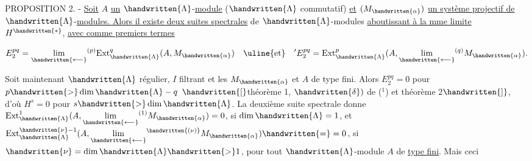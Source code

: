 
PROPOSITION 2. - \uline{Soit} $A$ \uline{un} $\handwritten{\Lambda}$-\uline{module} ($\handwritten{\Lambda}$ commutatif) \uline{et} $(M_{\handwritten{\alpha}})$ \uline{un système projectif de} $\handwritten{\Lambda}$-\uline{modules. Alors il existe deux suites spectrales} de $\handwritten{\Lambda}$-modules \uline{aboutissant à la mme limite} $H^{\handwritten{*}}$, \uline{avec comme premiers termes}

\[ E_2^{pq}=\underset{\handwritten{\longleftarrow}}{\lim}^{(p)}\mathrm{Ext}_{\handwritten{\Lambda}}^{q}(A,M_{\handwritten{\alpha}})\quad\text{\uline{et}}\quad {}'E_2^{pq}=\mathrm{Ext}_{\handwritten{\Lambda}}^{p}(A,\underset{\handwritten{\longleftarrow}}{\lim}^{(q)}M_{\handwritten{\alpha}}). \]

Soit maintenant $\handwritten{\Lambda}$ régulier, $I$ filtrant et les $M_{\handwritten{\alpha}}$ et $A$ de type fini. Alors $E_2^{pq}=0$ pour $p\handwritten{>}\dim \handwritten{\Lambda}-q$ $\handwritten{[}$théorème 1, $\handwritten{\delta})$ de ($^{1}$) et théorème 2$\handwritten{]}$, d'où $H^s=0$ pour $s\handwritten{>}\dim \handwritten{\Lambda}$. La deuxième suite spectrale donne $\mathrm{Ext}_{\handwritten{\Lambda}}^{1}(A,\underset{\handwritten{\longleftarrow}}{\lim}^{(1)}M_{\handwritten{\alpha}})=0$, si $\dim \handwritten{\Lambda}=1$, et $\mathrm{Ext}_{\handwritten{\Lambda}}^{\handwritten{\nu}-1}(A,\underset{\handwritten{\longleftarrow}}{\lim}^{\handwritten{(\nu)}}M_{\handwritten{\alpha}})\handwritten{=}=0$, si $\handwritten{\nu}=\dim \handwritten{\Lambda}\handwritten{>}1$, pour tout $\handwritten{\Lambda}$-module $A$ de \uline{type fini}. Mais ceci


